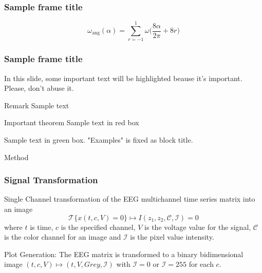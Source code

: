 \documentclass[aspectratio=169]{beamer}
\begin{document}
\begin{frame}
\frametitle{Sample frame title}
\begin{equation}
 \omega_\mathrm{ang}(\alpha) = \sum_{r=-1}^{1} \omega \bigg ( \frac{8\alpha}{2\pi} + 8r \bigg )
\label{eq:wang}
\end{equation}
\end{frame}

\begin{frame}
\frametitle{Sample frame title}
 
In this slide, some important text will be
\alert{highlighted} beause it's important.
Please, don't abuse it.
 
\begin{block}{Remark}
Sample text
\end{block}
 
\begin{alertblock}{Important theorem}
Sample text in red box
\end{alertblock}
 
\begin{examples}
Sample text in green box. "Examples" is fixed as block title.
\end{examples}
\end{frame}

    \begin{frame}
        \begin{center}
            \LARGE Method   
        \end{center}
    \end{frame}
    
    \begin{frame}
        \frametitle{Signal Transformation}
        \begin{center}           

Single Channel transformation of the EEG multichannel time series matrix into an image
\begin{equation}
\mathscr{T}\{x(t,c,V)=0\} \mapsto I(z_1,z_2, \mathcal{C}, \mathcal{I}) = 0
\end{equation}
where $ t $ is time, $ c $ is the specified channel, $ V $ is the voltage value for the signal, $ \mathcal{C} $ is the color channel for an image and  $ \mathcal{I} $ is the pixel value intensity.

\vspace{17pt}

Plot Generation: The EEG matrix is transformed to a binary bidimensional image $ (t,c,V) \mapsto (t, V, Grey, \mathcal{I}) $ with $\mathcal{I} = 0$ or  $\mathcal{I} = 255$ for each $ c $.

		\end{center}
	\end{frame}
	
\end{document}
